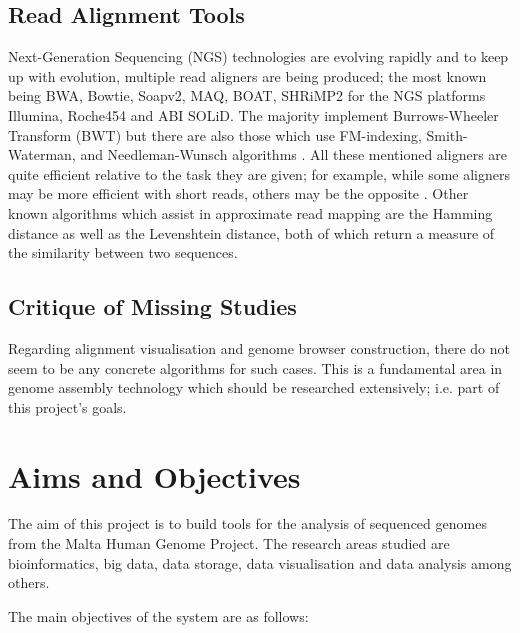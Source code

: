 \documentclass{csfyp}
\begin{document}
\subsection{Read Alignment Tools}
Next-Generation Sequencing (NGS) technologies are evolving rapidly and to keep up with evolution, multiple read aligners are being produced; the most known being BWA, Bowtie, Soapv2, MAQ, BOAT, SHRiMP2 for the NGS platforms Illumina, Roche454 and ABI SOLiD.  The majority implement Burrows-Wheeler Transform (BWT) but there are also those which use FM-indexing, Smith-Waterman,  and Needleman-Wunsch algorithms \cite{bwtransform, popgen, cgreads}.  All these mentioned aligners are quite efficient relative to the task they are given; for example, while some aligners may be more efficient with short reads, others may be the opposite \cite{companalys, compalign}.  Other known algorithms which assist in approximate read mapping are the Hamming distance as well as the Levenshtein distance, both of which return a measure of the similarity between two sequences.

\subsection{Critique of Missing Studies}
Regarding alignment visualisation and genome browser construction, there do not seem to be any concrete algorithms for such cases.  This is a fundamental area in genome assembly technology which should be researched extensively; i.e. part of this project's goals.     

\section{Aims and Objectives}

The aim of this project is to build tools for the analysis of sequenced genomes from the Malta Human Genome Project.  The research areas studied are bioinformatics, big data, data storage, data visualisation and data analysis among others.

The main objectives of the system are as follows:
\end{document}
